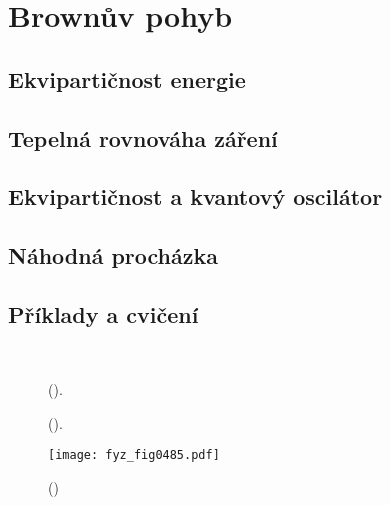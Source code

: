 \setchaptertoc
\chapter{Brownův pohyb}\label{fyz:IchapXLI}

  \section{Ekvipartičnost energie}\label{fyz:IchapXLIsecI}
  \section{Tepelná rovnováha záření}\label{fyz:IchapXLIsecII}
  \section{Ekvipartičnost a kvantový oscilátor}\label{fyz:IchapXLIsecIII}
  \section{Náhodná procházka}\label{fyz:IchapXLIsecIV}
  \section{Příklady a cvičení}\label{fyz:IchapXLIsecV}

  \begin{figure}[hb!] %
    \centering
      \\
    \caption{
             (\cite[s.~601]{Feynman01}).}
    \label{fyz:fig0483}
  \end{figure}

  \begin{figure}[hb!] %
    \centering
    \caption{
             (\cite[s.~601]{Feynman01}).}
    \label{fyz:fig0484}
  \end{figure}

    \begin{figure}[ht!] %
      \centering
      \texttt{[image: fyz\_fig0485.pdf]}
      \caption{ 
               (\cite[s.~707]{Feynman01})}
      \label{fyz:fig0485}
    \end{figure}

